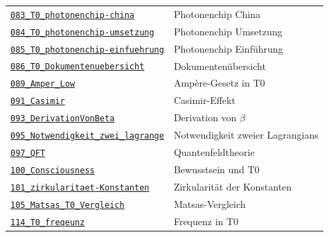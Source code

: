 {\begin{longtable}{@{}>{\raggedright\arraybackslash}p{} >{\raggedright\arraybackslash}p{}@{}}
\href{https://github.com/jpascher/T0-Time-Mass-Duality/blob/main/2/pdf/083_T0_photonenchip-china_De.pdf}{\texttt{083\_T0\_photonenchip-china}} & Photonenchip China \\
\href{https://github.com/jpascher/T0-Time-Mass-Duality/blob/main/2/pdf/084_T0_photonenchip-umsetzung_De.pdf}{\texttt{084\_T0\_photonenchip-umsetzung}} & Photonenchip Umsetzung \\
\href{https://github.com/jpascher/T0-Time-Mass-Duality/blob/main/2/pdf/085_T0_photonenchip-einfuehrung_De.pdf}{\texttt{085\_T0\_photonenchip-einfuehrung}} & Photonenchip Einführung \\
\href{https://github.com/jpascher/T0-Time-Mass-Duality/blob/main/2/pdf/086_T0_Dokumentenuebersicht_De.pdf}{\texttt{086\_T0\_Dokumentenuebersicht}} & Dokumentenübersicht \\
\href{https://github.com/jpascher/T0-Time-Mass-Duality/blob/main/2/pdf/089_Amper_Low_De.pdf}{\texttt{089\_Amper\_Low}} & Ampère-Gesetz in T0 \\
\href{https://github.com/jpascher/T0-Time-Mass-Duality/blob/main/2/pdf/091_Casimir_De.pdf}{\texttt{091\_Casimir}} & Casimir-Effekt \\
\href{https://github.com/jpascher/T0-Time-Mass-Duality/blob/main/2/pdf/093_DerivationVonBeta_De.pdf}{\texttt{093\_DerivationVonBeta}} & Derivation von $\beta$ \\
\href{https://github.com/jpascher/T0-Time-Mass-Duality/blob/main/2/pdf/095_Notwendigkeit_zwei_lagrange_De.pdf}{\texttt{095\_Notwendigkeit\_zwei\_lagrange}} & Notwendigkeit zweier Lagrangians \\
\href{https://github.com/jpascher/T0-Time-Mass-Duality/blob/main/2/pdf/097_QFT_De.pdf}{\texttt{097\_QFT}} & Quantenfeldtheorie \\
\href{https://github.com/jpascher/T0-Time-Mass-Duality/blob/main/2/pdf/100_Consciousness_De.pdf}{\texttt{100\_Consciousness}} & Bewusstsein und T0 \\
\href{https://github.com/jpascher/T0-Time-Mass-Duality/blob/main/2/pdf/101_zirkularitaet-Konstanten_De.pdf}{\texttt{101\_zirkularitaet-Konstanten}} & Zirkularität der Konstanten \\
\href{https://github.com/jpascher/T0-Time-Mass-Duality/blob/main/2/pdf/105_Matsas_T0_Vergleich_De.pdf}{\texttt{105\_Matsas\_T0\_Vergleich}} & Matsas-Vergleich \\
\href{https://github.com/jpascher/T0-Time-Mass-Duality/blob/main/2/pdf/114_T0_freqeunz_De.pdf}{\texttt{114\_T0\_freqeunz}} & Frequenz in T0 \\

\end{longtable}}
